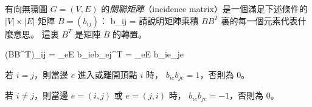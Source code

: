 \startEXERCISE
有向無環圖 $G=(V,E)$ 的\emph{關聯矩陣}（incidence matrix）是一個滿足下述條件的 $|V|\times|E|$ 矩陣 $B=(b_{ij})$：
\startformula
b_{ij} = \startcases
{} \NC {} \NR
{} \NC {} \NR
{} \NC {} \NR
\stopcases
\stopformula
請說明矩陣乘積 $BB^T$ 裏的每一個元素代表什麼意思。
這裏 $B^T$ 是矩陣 $B$ 的轉置。
\stopEXERCISE

\startANSWER
\startsplitformula\startmathalignment
\NC (BB^T)_{ij} \NC = \sum_{e\in E} b_{ie}b_{ej}^T \NR
\NC \NC = \sum_{e\in E} b_{ie}\_{je} \NR
\stopmathalignment\stopsplitformula

若 $i = j$，則當邊 $e$ 進入或離開頂點 $i$ 時， $b_{ie}b_{je} = 1$，否則為 $0$。

若 $i\ne j$，則當邊 $e=(i,j)$ 或 $e=(j,i)$ 時， $b_{ie}b_{je} = -1$，否則為 $0$。
\stopANSWER
